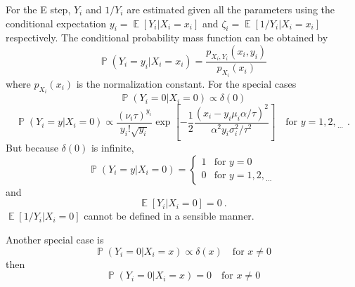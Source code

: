 \documentclass[12pt]{report}
\DeclareMathOperator{\expectation}{\mathbb{E}}
\DeclareMathOperator{\prob}{\mathbb{P}}
\newcommand{\dotdotdot}{_{\phantom{.}\cdots}}
\begin{document}
For the E step, $Y_i$ and $1/Y_i$ are estimated given all the parameters using the conditional expectation $y_i=\expectation\left[Y_i|X_i=x_i\right]$ and $\zeta_i=\expectation\left[1/Y_i|X_i=x_i\right]$ respectively. The conditional probability mass function can be obtained by
\begin{equation*}
\prob\left(Y_i=y_i|X_i=x_i\right)=\frac{p_{X_i,Y_i}\left(x_i,y_i\right)}{p_{X_i}(x_i)}
\end{equation*}
where $p_{X_i}(x_i)$ is the normalization constant.
For the special cases
\begin{equation*}
\prob\left(Y_i=0|X_i=0\right) \propto \delta(0)
\end{equation*}
\begin{equation*}
\prob\left(Y_i=y|X_i=0\right) \propto
\dfrac{(\nu_i\tau)^{y_i}}{y_i!\sqrt{y_i}}
\exp\left[-\dfrac{1}{2}\dfrac{\left(x_i-y_i\mu_i\alpha/\tau\right)^2}{\alpha^2y_i\sigma_i^2/\tau^2}\right]
\quad \text{for }y=1,2,\dotdotdot \ .
\end{equation*}
But because $\delta(0)$ is infinite,
\begin{equation}
\prob\left(Y_i=y|X_i=0\right) =
\begin{cases}
1 & \text{for }y=0
\\
0 & \text{for }y=1,2,\dotdotdot
\end{cases}
\end{equation}
and
\begin{equation}
\expectation[Y_i|X_i=0] = 0 \ .
\end{equation}
$\expectation[1/Y_i|X_i=0]$ cannot be defined in a sensible manner.

Another special case is
\begin{equation*}
\prob\left(Y_i=0|X_i=x\right) \propto \delta(x) \quad \text{for }x\neq0
\end{equation*}
then
\begin{equation}
\prob\left(Y_i=0|X_i=x\right) = 0 \quad \text{for }x\neq0
\end{equation}
\end{document}
